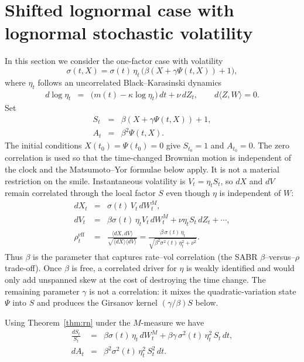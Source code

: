 \documentclass[12pt,a4paper,final]{article}
\theoremstyle{plain}
\begin{document}
\section{Shifted lognormal case with lognormal stochastic volatility}
In this section we consider the one-factor case with volatility
\begin{equation}
\sigma(t,X)=\sigma(t)\,\eta_t\,\bigl(\beta (X + \gamma \Psi(t,X))+1\bigr),
\end{equation}
where $\eta_t$ follows an uncorrelated Black--Karasinski dynamics~\cite{BK}
\begin{eqnarray}
d\log\eta_t
&=&\bigl(m(t)-\kappa\log\eta_t\bigr)\,dt+\nu\,dZ_t,
\qquad
d\langle Z,W\rangle=0.
\end{eqnarray}
Set
\begin{eqnarray*}
S_t&=& \beta (X +\gamma \Psi(t,X))+1,\\
A_t&=& \beta^2 \Psi(t,X).
\end{eqnarray*}
The initial conditions $X(t_0)=\Psi(t_0)=0$ give $S_{t_0}=1$ and $A_{t_0}=0$.
The zero correlation is used so that the time-changed Brownian motion is
independent of the clock and the Matsumoto--Yor formulae below apply. It is
not a material restriction on the smile. Instantaneous volatility is
$V_t=\eta_t S_t$, so $dX$ and $dV$ remain correlated through the local factor
$S$ even though $\eta$ is independent of $W$:
\begin{eqnarray*}
dX_t&=&\sigma(t)\,V_t\,dW^M_t,\\
dV_t&=&\beta\sigma(t)\,\eta_t V_t\,dW^M_t
+\nu\eta_t S_t\,dZ_t+\cdots,\\
\rho^{\mathrm{eff}}_t
&=&
\frac{\langle dX,dV\rangle}{\sqrt{\langle dX\rangle\langle dV\rangle}}
=
\frac{\beta\,\sigma(t)\,\eta_t}{\sqrt{\beta^{2}\sigma^{2}(t)\,\eta_t^{2}+\nu^{2}}}.
\end{eqnarray*}
Thus $\beta$ is the parameter that captures rate--vol correlation (the SABR
$\beta$--versus--$\rho$ trade-off). Once $\beta$ is free, a correlated driver
for $\eta$ is weakly identified and would only add unspanned skew at the cost
of destroying the time change. The remaining parameter $\gamma$ is not a
correlation: it mixes the quadratic-variation state $\Psi$ into $S$ and
produces the Girsanov kernel $(\gamma/\beta)S$ below.

Using Theorem~\ref{thm:rn} under the $M$-measure we have
\begin{eqnarray}
\frac{dS_t}{S_t}
&=&\beta\sigma(t)\,\eta_t\,dW^M_t
+\beta\gamma\,\sigma^2(t)\,\eta_t^{2}\,S_t\,dt,\\
dA_t&=&\beta^2 \sigma^2(t)\,\eta_t^{2}\,S^2_t\,dt.
\end{eqnarray}
\end{document}
